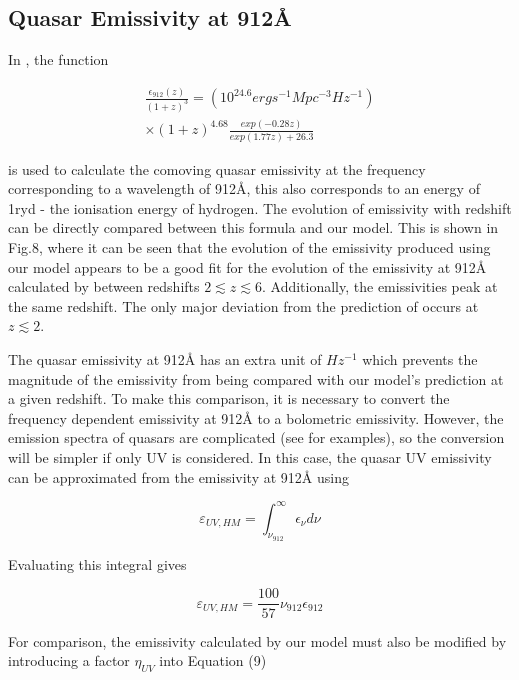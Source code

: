 \documentclass[12pt, twocolumn]{report}%
\begin{document}
\subsection{Quasar Emissivity at 912\AA}

In \cite{Haardt_Madau}, the function

\begin{multline}
    \frac{\epsilon_{912}(z)}{(1+z)^3}=(10^{24.6}erg s^{-1}Mpc^{-3}Hz^{-1})\\
    \times(1+z)^{4.68}\frac{exp(-0.28z)}{exp(1.77z)+26.3}
\end{multline}

\noindent is used to calculate the comoving quasar emissivity at the frequency corresponding to a wavelength of 912\AA, this also corresponds to an energy of 1ryd - the ionisation energy of hydrogen. The evolution of emissivity with redshift can be directly compared between this formula and our model. This is shown in Fig.8, where it can be seen that the evolution of the emissivity produced using our model appears to be a good fit for the evolution of the emissivity at 912\AA \: calculated by \cite{Haardt_Madau} between redshifts $2\lesssim z\lesssim6$. Additionally, the emissivities peak at the same redshift. The only major deviation from the prediction of \citeauthor{Haardt_Madau} occurs at $z\lesssim2$.\par

The quasar emissivity at 912\AA \: has an extra unit of $Hz^{-1}$ which prevents the magnitude of the emissivity from being compared with our model's prediction at a given redshift. To make this comparison, it is necessary to convert the frequency dependent emissivity at 912\AA \: to a bolometric emissivity. However, the emission spectra of quasars are complicated (see \cite{QSO_Spectrum} for examples), so the conversion will be simpler if only UV is considered. In this case, the quasar UV emissivity can be approximated from the emissivity at 912\AA \: using

\begin{equation}
    \varepsilon_{UV,HM}=\int_{\nu_{912}}^{\infty}\epsilon_\nu d\nu
\end{equation}

\noindent Evaluating this integral gives

\begin{equation}
    \varepsilon_{UV,HM}=\frac{100}{57}\nu_{912}\epsilon_{912}
\end{equation}

For comparison, the emissivity calculated by our model must also be modified by introducing a factor $\eta_{UV}$ into Equation (9)
\end{document}
